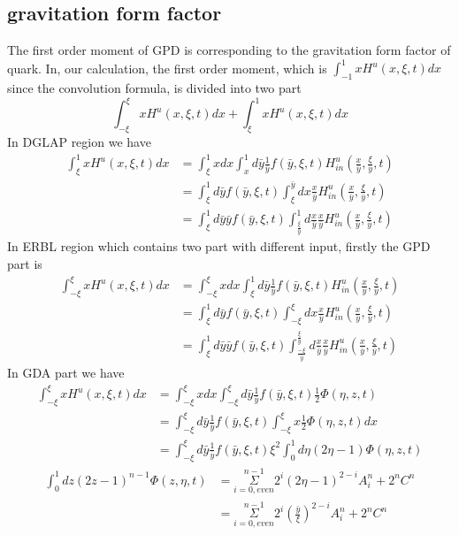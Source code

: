 \documentclass[preprintnumbers,prd,superscriptaddress,preprint]{revtex4-1}
\begin{document}
	\subsection{gravitation form factor}
	The first order moment of GPD is corresponding to the gravitation form factor of quark. In, our calculation, the first order moment, which is $\int_{-1}^{1}xH^{u}(x,\xi,t)dx$ since the convolution formula, is divided into two part 
	\[\int_{-\xi}^{\xi}xH^{u}(x,\xi,t)dx+\int_{\xi}^{1}xH^{u}(x,\xi,t)dx\]
	In DGLAP region we have 
	\begin{align*}
		\int_{\xi}^{1}xH^{u}(x,\xi,t)dx & =\int_{\xi}^{1}xdx\int_{x}^{1}d\bar{y}\frac{1}{\bar{y}}f(\bar{y},\xi,t)H_{in}^{u}(\frac{x}{\bar{y}},\frac{\xi}{\bar{y}},t)\\
		& =\int_{\xi}^{1}d\bar{y}f(\bar{y},\xi,t)\int_{\xi}^{\bar{y}}dx\frac{x}{\bar{y}}H_{in}^{u}(\frac{x}{\bar{y}},\frac{\xi}{\bar{y}},t)\\
		& =\int_{\xi}^{1}d\bar{y}\bar{y}f(\bar{y},\xi,t)\int_{\frac{\xi}{\bar{y}}}^{1}d\frac{x}{\bar{y}}\frac{x}{\bar{y}}H_{in}^{u}(\frac{x}{\bar{y}},\frac{\xi}{\bar{y}},t)
	\end{align*}
	In ERBL region which contains two part with different input, firstly the GPD part is 
	\begin{align*}
		\int_{-\xi}^{\xi}xH^{u}(x,\xi,t)dx & =\int_{-\xi}^{\xi}xdx\int_{\xi}^{1}d\bar{y}\frac{1}{\bar{y}}f(\bar{y},\xi,t)H_{in}^{u}(\frac{x}{\bar{y}},\frac{\xi}{\bar{y}},t)\\
		& =\int_{\xi}^{1}d\bar{y}f(\bar{y},\xi,t)\int_{-\xi}^{\xi}dx\frac{x}{\bar{y}}H_{in}^{u}(\frac{x}{\bar{y}},\frac{\xi}{\bar{y}},t)\\
		& =\int_{\xi}^{1}d\bar{y}\bar{y}f(\bar{y},\xi,t)\int_{\frac{-\xi}{\bar{y}}}^{\frac{\xi}{\bar{y}}}d\frac{x}{\bar{y}}\frac{x}{\bar{y}}H_{in}^{u}(\frac{x}{\bar{y}},\frac{\xi}{\bar{y}},t)
	\end{align*}
	In GDA part we have 
	\begin{align*}
		\int_{-\xi}^{\xi}xH^{u}(x,\xi,t)dx & =\int_{-\xi}^{\xi}xdx\int_{-\xi}^{\xi}d\bar{y}\frac{1}{\bar{y}}f(\bar{y},\xi,t)\frac{1}{2}\Phi(\eta,z,t)\\
		& =\int_{-\xi}^{\xi}d\bar{y}\frac{1}{\bar{y}}f(\bar{y},\xi,t)\int_{-\xi}^{\xi}x\frac{1}{2}\Phi(\eta,z,t)dx\\
		& =\int_{-\xi}^{\xi}d\bar{y}\frac{1}{\bar{y}}f(\bar{y},\xi,t)\xi^{2}\int_{0}^{1}d\eta(2\eta-1)\Phi(\eta,z,t)
	\end{align*}
	\begin{align*}
		\int_{0}^{1}dz(2z-1)^{n-1}\Phi(z,\eta,t) & =\underset{i=0,even}{\overset{n-1}{\Sigma}}2^{i}(2\eta-1)^{2-i}A_{i}^{n}+2^{n}C^{n}\\
		& =\underset{i=0,even}{\overset{n-1}{\Sigma}}2^{i}(\frac{\bar{y}}{\xi})^{2-i}A_{i}^{n}+2^{n}C^{n}
	\end{align*}
\end{document}
